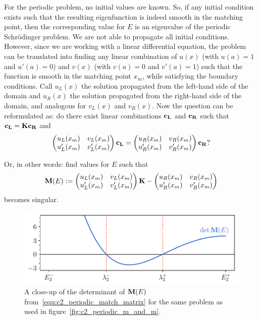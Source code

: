 For the periodic problem, no initial values are known. So, if any initial condition exists such that the resulting eigenfunction is indeed smooth in the matching point, then the corresponding value for $E$ is an eigenvalue of the periodic Schrödinger problem. We are not able to propagate all initial conditions. However, since we are working with a linear differential equation, the problem can be translated into finding any linear combination of $u(x)$ (with $u(a) = 1$ and $u'(a)=0$) and $v(x)$ (with $v(a) = 0$ and $v'(a)=1$) such that the function is smooth in the matching point $x_m$, while satisfying the boundary conditions. Call $u_L(x)$ the solution propagated from the left-hand side of the domain and $u_R(x)$ the solution propagated from the right-hand side of the domain, and analogous for $v_L(x)$ and $v_R(x)$. Now the question can be reformulated as: do there exist linear combinations $\vb{c_L}$ and $\vb{c_R}$ such that $\vb{c_L} = \vb{K}\vb{c_R}$ and
$$
    \begin{pmatrix}
        u_L(x_m)  & v_L(x_m)  \\
        u'_L(x_m) & v'_L(x_m)
    \end{pmatrix} \vb{c_L} = \begin{pmatrix}
        u_R(x_m)  & v_R(x_m)  \\
        u'_R(x_m) & v'_R(x_m)
    \end{pmatrix}\vb{c_R}\text{?}
$$

Or, in other words: find values for $E$ such that
\begin{equation}\label{equ:c2_periodic_match_matrix}
    \vb{M}(E) := \begin{pmatrix}
        u_L(x_m)  & v_L(x_m)  \\
        u'_L(x_m) & v'_L(x_m)
    \end{pmatrix} \vb{K} - \begin{pmatrix}
        u_R(x_m)  & v_R(x_m)  \\
        u'_R(x_m) & v'_R(x_m)
    \end{pmatrix}
\end{equation}
becomes singular.

\begin{figure}
    \begin{center}
        \includegraphics[width=\textwidth]{img/chapter2/prufer/periodic_matching.pdf}
    \end{center}
    \caption{A close-up of the determinant of $\vb{M}(E)$ from~\eqref{equ:c2_periodic_match_matrix} for the same problem as used in figure~\ref{fig:c2_periodic_m_and_m}.}\label{fig:c2_periodic_matching}
\end{figure}


